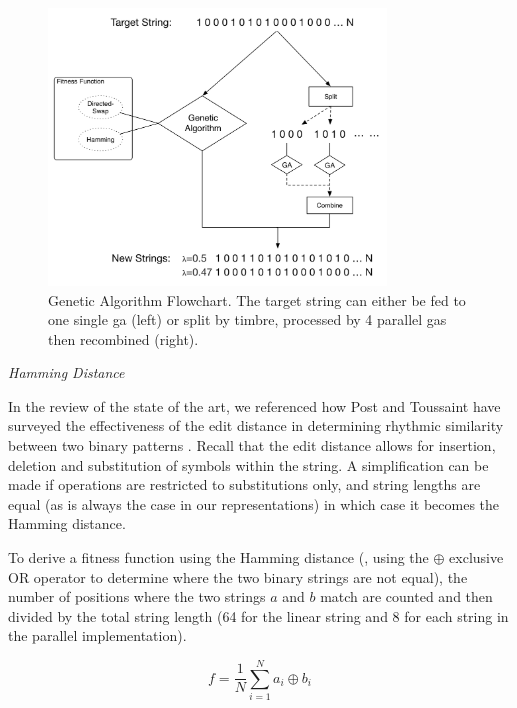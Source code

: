 \begin{figure}
	\begin{center}
		\includegraphics[width=0.8\textwidth]{ch03_symbolic/figures/ga_algorithm.png}
	\end{center}
	\caption[Genetic Algorithm Flowchart]{Genetic Algorithm Flowchart. The target string can either be fed to one single \acrshort{ga} (left) or split by timbre, processed by 4 parallel \acrshort{ga}s then recombined (right).}
	\label{fig:genetic}
\end{figure}

\textit{Hamming Distance}

In the review of the state of the art, we referenced how Post and Toussaint have surveyed the effectiveness of the edit distance in determining rhythmic similarity between two binary patterns \citep{Post2011}. Recall that the edit distance allows for insertion, deletion and substitution of symbols within the string. A simplification can be made if operations are restricted to substitutions only, and string lengths are equal (as is always the case in our representations) in which case it becomes the Hamming distance. 

To derive a fitness function using the Hamming distance (, using the $\oplus$ exclusive OR operator to determine where the two binary strings are not equal), the number of positions where the two strings $a$ and $b$ match are counted and then divided by the total string length (64 for the linear string and 8 for each string in the parallel implementation). 

\begin{equation}
\label{eq:fitness_hamming}
	f=\frac{1}{N}\sum_{i=1}^{N}a_i \oplus b_i
\end{equation}

